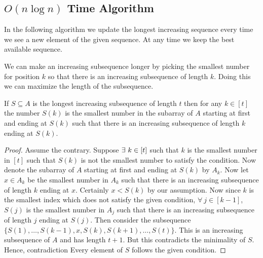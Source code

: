 \subsection{\texorpdfstring{$O(n\log n)$}{O(logn)} Time Algorithm}
In the following algorithm we update the longest increasing sequence every time we see a new element of the given sequence. At any time we keep the best available sequence.
\begin{idea*}
	We can make an increasing subsequence longer by picking the smallest number for position $k$ so that there is an increasing subsequence of length $k$. Doing this we can maximize the length of the subsequence. 
\end{idea*}

\begin{Theorem}{}{}
	If $S\subseteq A$ is the longest increasing subsequence of length $t$ then for any $k\in[t]$ the number $S(k)$ is the smallest number in the subarray of $A$ starting at first  and ending at $S(k)$ such that there is an increasing subsequence of length $k$ ending at $S(k)$.
\end{Theorem}
\begin{proof}
	Assume the contrary. Suppose $\exists\ k\in[t]$ such that $k$ is the smallest number in $[t]$ such that $S(k)$ is not the smallest number to satisfy the condition. Now denote the subarray of $A$ starting at first  and ending at $S(k)$ by $A_k$. Now let $x\in A_k$ be the smallest number in $A_k$ such that there is an increasing subsequence of length $k$ ending at $x$. Certainly $x<S(k)$ by our assumption. Now since $k$ is the smallest index which does not satisfy the given condition, $\forall\ j\in[k-1]$, $S(j)$ is the smallest number in $A_j$ such that there is an increasing subsequence of length $j$ ending at $S(j)$. Then consider the subsequence $\{S(1),\dots, S(k-1),x,S(k),S(k+1),\dots, S(t)\}$. This is an increasing subsequence of $A$ and has length $t+1$. But this contradicts the minimality of $S$. Hence, contradiction \ctr Every element of $S$ follows the given condition. 
\end{proof}

